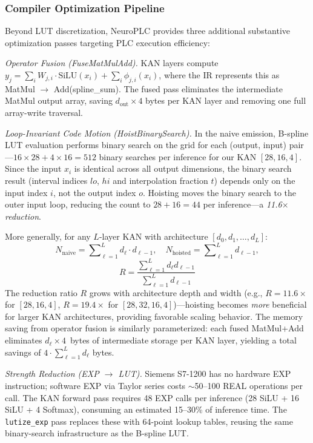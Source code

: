\documentclass[journal,onecolumn]{IEEEtran}
\newcommand{\neuroplc}{NeuroPLC\xspace}
\begin{document}
\subsubsection{Compiler Optimization Pipeline}

Beyond LUT discretization, \neuroplc provides three additional substantive
optimization passes targeting PLC execution efficiency:

\textit{Operator Fusion (FuseMatMulAdd).} KAN layers compute
$y_j = \sum_i W_{j,i} \cdot \text{SiLU}(x_i) + \sum_i \phi_{j,i}(x_i)$,
where the IR represents this as MatMul $\rightarrow$ Add(spline\_sum).
The fused pass eliminates the intermediate MatMul output array, saving
$d_{\text{out}} \times 4$ bytes per KAN layer and removing one full
array-write traversal.

\textit{Loop-Invariant Code Motion (HoistBinarySearch).} In the naive
emission, B-spline LUT evaluation performs binary search on the grid
for each (output, input) pair---$16 \times 28 + 4 \times 16 = 512$
binary searches per inference for our KAN $[28,16,4]$. Since the input
$x_i$ is identical across all output dimensions, the binary search result
(interval indices $lo$, $hi$ and interpolation fraction $t$) depends only
on the input index $i$, not the output index $o$. Hoisting moves the
binary search to the outer input loop, reducing the count to
$28 + 16 = 44$ per inference---a \textit{11.6$\times$ reduction}.

More generally, for any $L$-layer KAN with architecture $[d_0,d_1,\dots,d_L]$:
\begin{equation}
N_{\text{naive}} = \sum\nolimits_{\ell=1}^L d_{\ell} \cdot d_{\ell-1}, \quad
N_{\text{hoisted}} = \sum\nolimits_{\ell=1}^L d_{\ell-1},
\end{equation}
\begin{equation}
R = \frac{\sum_{\ell=1}^L d_{\ell}d_{\ell-1}}{\sum_{\ell=1}^L d_{\ell-1}}
\label{eq:hoisting_ratio}
\end{equation}
The reduction ratio $R$ grows with architecture depth and width
(e.g., $R=11.6\times$ for $[28,16,4]$, $R=19.4\times$ for
$[28,32,16,4]$)---hoisting becomes \textit{more} beneficial for
larger KAN architectures, providing favorable scaling behavior.
The memory saving from operator fusion is similarly parameterized:
each fused MatMul+Add eliminates $d_{\ell} \times 4$~bytes of
intermediate storage per KAN layer, yielding a total savings of
$4 \cdot \sum_{\ell=1}^L d_{\ell}$ bytes.

\textit{Strength Reduction (EXP $\rightarrow$ LUT).} Siemens S7-1200
has no hardware EXP instruction; software EXP via Taylor series costs
$\sim$50--100 REAL operations per call. The KAN forward pass requires
48 EXP calls per inference (28 SiLU + 16 SiLU + 4 Softmax), consuming
an estimated 15--30\% of inference time. The \texttt{lutize\_exp} pass
replaces these with 64-point lookup tables, reusing the same binary-search
infrastructure as the B-spline LUT.
\end{document}
